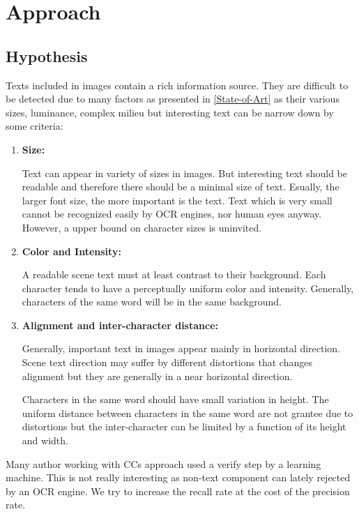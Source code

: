    
\graphicspath{ {4chapterOurApproach/image/} }
\chapter{Approach} \label{Approach}
\section{Hypothesis}
\par
Texts included in images contain a rich information source. They are difficult to be detected due to many factors as presented in \ref{State-of-Art} as their various sizes, luminance, complex milieu but interesting text can be narrow down by some criteria:
\begin{enumerate}
\item {\textbf{Size:}}
\par
Text can appear in variety of sizes in images. But interesting text should be readable and therefore there should be a minimal size of text. Esually, the larger font size, the more important is the text. Text which is very small cannot be recognized easily by OCR engines, nor human eyes anyway. However, a upper bound on character sizes is uninvited.
\item {\textbf{Color and Intensity:}}
\par
A readable scene text must at least contrast to their background. Each character tends to have a perceptually uniform color and intensity. Generally, characters of the same word will be in the same background.
\item {\textbf{Alignment and inter-character distance:}}
\par
Generally, important text in images appear mainly in horizontal direction. Scene text direction may suffer by different distortions that changes alignment but they are generally in a near horizontal direction. 
\par
Characters in the same word should have small variation in height. The uniform distance between characters in the same word are not grantee due to distortions but the inter-character can be limited by a function of its height and width. 
\end{enumerate}
\par
Many author working with CCs approach used a verify step by a learning machine. This is not really interesting as non-text component can lately rejected by an OCR engine. We try to increase the recall rate at the cost of the precision rate.
